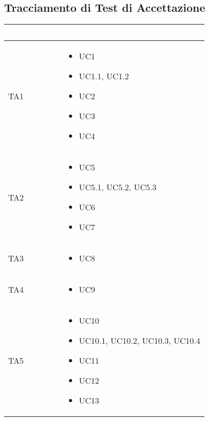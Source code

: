 \newpage

\subsection{Tracciamento di Test di Accettazione}

{
    \setlength{\freewidth}{\dimexpr\textwidth-10\tabcolsep}
    \renewcommand{\arraystretch}{1.5}
    \centering
    \setlength{\aboverulesep}{0pt}
    \setlength{\belowrulesep}{0pt}
    \begin{longtable}{C{.27\freewidth} C{.45\freewidth}}
       \toprule
    \textcolor{white}{\textbf{Codice Test}}&
    \textcolor{white}{\textbf{Codice caso d'uso}}\\
    \toprule
    \endhead

    TA1 & \begin{itemize}
        \item UC1
        \item UC1.1, UC1.2
        \item UC2
        \item UC3
        \item UC4
    \end{itemize} \\

    
    TA2 & \begin{itemize}
        \item UC5
        \item UC5.1, UC5.2, UC5.3
        \item UC6
        \item UC7
    \end{itemize} \\

    
    TA3 & \begin{itemize}
        \item UC8
    \end{itemize} \\

    
    TA4 & \begin{itemize}
        \item UC9
    \end{itemize} \\

    
    TA5 & \begin{itemize}
        \item UC10
        \item UC10.1, UC10.2, UC10.3, UC10.4
        \item UC11
        \item UC12
        \item UC13
    \end{itemize} \\


\end{longtable}}

